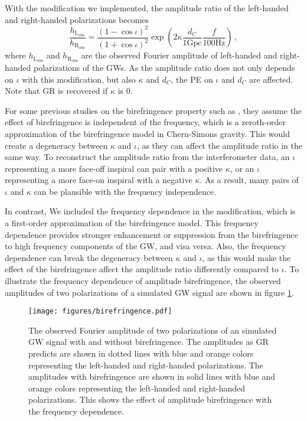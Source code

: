 \documentclass[reprint,amsmath,amssymb,aps,twocolumn]{aastex631}
\begin{document}
With the modification we implemented, the amplitude ratio of the left-handed and right-handed polarizations becomes 
\begin{equation}
    \frac{h_\mathrm{L_{obs}}}{h_\mathrm{R_{obs}}}=\frac{\left(1-\cos\iota\right)^2}{\left(1+\cos\iota\right)^2}\exp\left({2\kappa\frac{d_C}{1\mathrm{Gpc}}\frac{f}{100\mathrm{Hz}}}\right)\,,
\end{equation}
where $h_\mathrm{L_{obs}}$ and $h_\mathrm{R_{obs}}$ are the observed Fourier amplitude of left-handed and right-handed polarizations of the GWs.
As the amplitude ratio does not only depends on $\iota$ with this modification, but also $\kappa$ and $d_C$, the PE on $\iota$ and $d_C$ are affected. Note that GR is recovered if $\kappa$ is $0$.

For some previous studies on the birefringence property such as \citet{Maria_2021}, they assume the effect of birefringence is independent of the frequency, which is a zeroth-order approximation of the birefringence model in Chern-Simons gravity.
This would create a degeneracy between $\kappa$ and $\iota$, as they can affect the amplitude ratio in the same way.
To reconstruct the amplitude ratio from the interferometer data, an $\iota$ representing a more face-off inspiral can pair with a positive $\kappa$, or an $\iota$ representing a more face-on inspiral with a negative $\kappa$.
As a result, many pairs of $\iota$ and $\kappa$ can be plausible with the frequency independence.

In contrast, We included the frequency dependence in the modification, which is a first-order approximation of the birefringence model.
This frequency dependence provides stronger enhancement or suppression from the birefringence to high frequency components of the GW, and visa versa.
Also, the frequency dependence can break the degeneracy between $\kappa$ and $\iota$, as this would make the effect of the birefringence affect the amplitude ratio differently compared to $\iota$.
To illustrate the frequency dependence of amplitude birefringence, the observed amplitudes of two polarizations of a simulated GW signal are shown in figure \ref{fig:birefringence}.

\begin{figure}[h]
    \texttt{[image: figures/birefringence.pdf]}
    \caption{
        The observed Fourier amplitude of two polarizations of an simulated GW signal with and without birefringence.
        The amplitudes as GR predicts are shown in dotted lines with blue and orange colors representing the left-handed and right-handed polarizations.
        The amplitudes with birefringence are shown in solid lines with blue and orange colors representing the left-handed and right-handed polarizations.
        This shows the effect of amplitude birefringence with the frequency dependence.
    }
    \label{fig:birefringence}
\end{figure}
\end{document}

